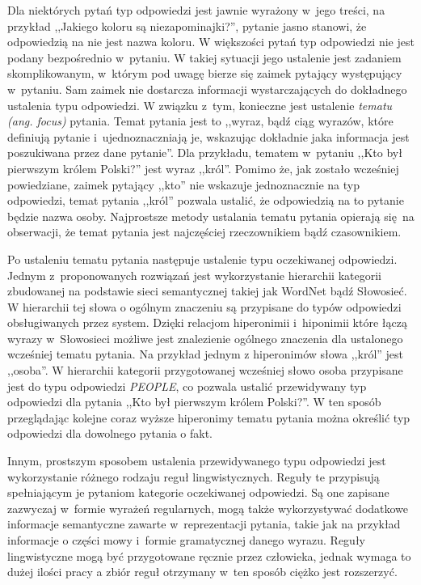 \documentclass[a4paper, twoside, 12pt]{report}
\begin{document}
            Dla niektórych pytań typ odpowiedzi jest jawnie wyrażony w~jego treści, na przykład ,,Jakiego koloru są
            niezapominajki?'', pytanie jasno stanowi, że odpowiedzią na nie jest nazwa koloru. W większości pytań
            typ odpowiedzi nie jest podany bezpośrednio w~pytaniu. W takiej sytuacji jego ustalenie jest zadaniem
            skomplikowanym, w~którym pod uwagę bierze się zaimek pytający występujący w~pytaniu. Sam zaimek nie dostarcza
            informacji wystarczających do dokładnego ustalenia typu odpowiedzi. W związku z~tym, konieczne jest ustalenie
            \emph{tematu (ang. focus)} pytania. Temat pytania jest to ,,wyraz, bądź ciąg wyrazów, które definiują pytanie
            i~ujednoznaczniają je, wskazując dokładnie jaka informacja jest poszukiwana przez dane pytanie''\cite{QUESTIONFOCUS}.
            Dla przykładu, tematem w~pytaniu ,,Kto był pierwszym królem Polski?'' jest wyraz ,,król''. Pomimo że,
            jak zostało wcześniej powiedziane, zaimek pytający ,,kto'' nie wskazuje jednoznacznie na typ odpowiedzi,
            temat pytania ,,król'' pozwala ustalić, że odpowiedzią na to pytanie będzie nazwa osoby.  Najprostsze metody
            ustalania tematu pytania opierają się na obserwacji, że temat pytania jest najczęściej rzeczownikiem bądź
            czasownikiem.

            Po ustaleniu tematu pytania następuje ustalenie typu oczekiwanej odpowiedzi. Jednym z~proponowanych
            rozwiązań jest wykorzystanie hierarchii kategorii zbudowanej na podstawie sieci semantycznej takiej jak
            WordNet bądź Słowosieć\cite{PASZKA}. W hierarchii tej słowa o ogólnym znaczeniu są przypisane do typów
            odpowiedzi obsługiwanych przez system. Dzięki relacjom hiperonimii i~hiponimii które łączą wyrazy w~Słowosieci
            możliwe jest znalezienie ogólnego znaczenia dla ustalonego wcześniej tematu pytania. Na przykład jednym z
            hiperonimów słowa ,,król'' jest ,,osoba''. W hierarchii kategorii przygotowanej wcześniej słowo osoba przypisane
            jest do typu odpowiedzi \emph{PEOPLE}, co pozwala ustalić przewidywany typ odpowiedzi dla pytania
            ,,Kto był pierwszym królem Polski?''. W ten sposób przeglądając kolejne coraz wyższe hiperonimy tematu
            pytania można określić typ odpowiedzi dla dowolnego pytania o fakt.

            Innym, prostszym sposobem ustalenia przewidywanego typu odpowiedzi jest wykorzystanie różnego rodzaju reguł
            lingwistycznych. Reguły te przypisują spełniającym je pytaniom kategorie oczekiwanej odpowiedzi. Są one zapisane
            zazwyczaj w~formie wyrażeń regularnych, mogą także wykorzystywać dodatkowe informacje semantyczne zawarte
            w~reprezentacji pytania, takie jak na przykład informacje o części mowy i~formie gramatycznej danego wyrazu.
            Reguły lingwistyczne mogą być przygotowane ręcznie przez człowieka, jednak wymaga to dużej ilości pracy a
            zbiór reguł otrzymany w~ten sposób ciężko jest rozszerzyć.
\end{document}
